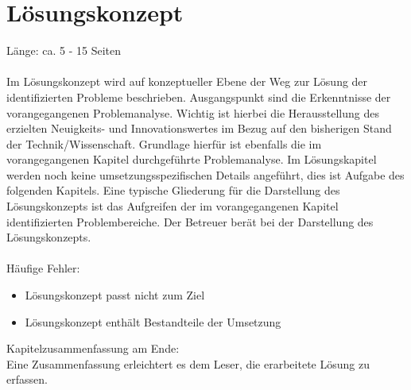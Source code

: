 \chapter{Lösungskonzept}
Länge: ca. 5 - 15 Seiten\\\\
Im Lösungskonzept wird auf konzeptueller Ebene der Weg zur Lösung der identifizierten Probleme beschrieben. Ausgangspunkt sind die Erkenntnisse der vorangegangenen Problemanalyse. Wichtig ist hierbei die Herausstellung des erzielten Neuigkeits- und Innovationswertes im Bezug auf den bisherigen Stand der Technik/Wissenschaft. Grundlage hierfür ist ebenfalls die im vorangegangenen Kapitel durchgeführte Problemanalyse. Im Lösungskapitel werden noch keine umsetzungsspezifischen Details angeführt, dies ist Aufgabe des folgenden Kapitels. Eine typische Gliederung für die Darstellung des Lösungskonzepts ist das Aufgreifen der im vorangegangenen Kapitel identifizierten Problembereiche. Der Betreuer berät bei der Darstellung des Lösungskonzepts.\\\\

\noindent Häufige Fehler:
\begin{itemize}
	\item Lösungskonzept passt nicht zum Ziel
	\item Lösungskonzept enthält Bestandteile der Umsetzung
\end{itemize}

\noindent Kapitelzusammenfassung am Ende:\\
Eine Zusammenfassung erleichtert es dem Leser, die erarbeitete Lösung zu erfassen.

